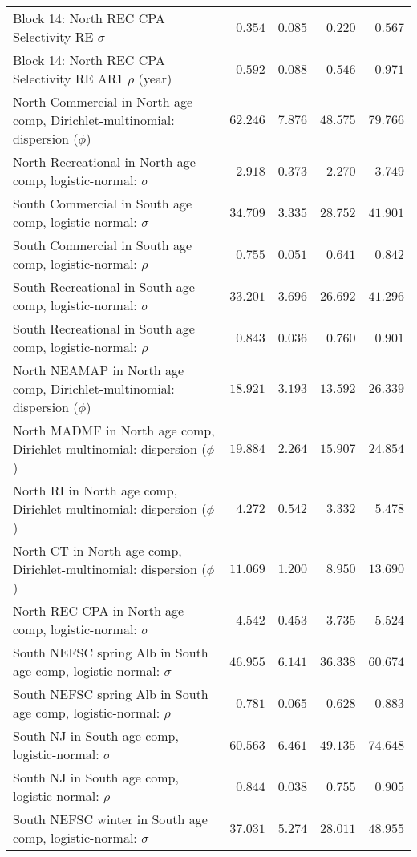\documentclass[
]{article}
\begin{document}
\begin{landscape}
\begin{longtable}[t]{lrrrr}
Block 14: North REC CPA Selectivity RE $\sigma$ & $0.354$ & $0.085$ & $0.220$ & $0.567$\\
\addlinespace
Block 14: North REC CPA Selectivity RE AR1 $\rho$ (year) & $0.592$ & $0.088$ & $0.546$ & $0.971$\\
North Commercial in North age comp, Dirichlet-multinomial: dispersion ($\phi$) & $62.246$ & $7.876$ & $48.575$ & $79.766$\\
North Recreational in North age comp, logistic-normal: $\sigma$ & $2.918$ & $0.373$ & $2.270$ & $3.749$\\
South Commercial in South age comp, logistic-normal: $\sigma$ & $34.709$ & $3.335$ & $28.752$ & $41.901$\\
South Commercial in South age comp, logistic-normal: $\rho$ & $0.755$ & $0.051$ & $0.641$ & $0.842$\\
\addlinespace
South Recreational in South age comp, logistic-normal: $\sigma$ & $33.201$ & $3.696$ & $26.692$ & $41.296$\\
South Recreational in South age comp, logistic-normal: $\rho$ & $0.843$ & $0.036$ & $0.760$ & $0.901$\\
North NEAMAP in North age comp, Dirichlet-multinomial: dispersion ($\phi$) & $18.921$ & $3.193$ & $13.592$ & $26.339$\\
North MADMF in North age comp, Dirichlet-multinomial: dispersion ($\phi$) & $19.884$ & $2.264$ & $15.907$ & $24.854$\\
North RI in North age comp, Dirichlet-multinomial: dispersion ($\phi$) & $4.272$ & $0.542$ & $3.332$ & $5.478$\\
\addlinespace
North CT in North age comp, Dirichlet-multinomial: dispersion ($\phi$) & $11.069$ & $1.200$ & $8.950$ & $13.690$\\
North REC CPA in North age comp, logistic-normal: $\sigma$ & $4.542$ & $0.453$ & $3.735$ & $5.524$\\
South NEFSC spring Alb in South age comp, logistic-normal: $\sigma$ & $46.955$ & $6.141$ & $36.338$ & $60.674$\\
South NEFSC spring Alb in South age comp, logistic-normal: $\rho$ & $0.781$ & $0.065$ & $0.628$ & $0.883$\\
South NJ in South age comp, logistic-normal: $\sigma$ & $60.563$ & $6.461$ & $49.135$ & $74.648$\\
\addlinespace
South NJ in South age comp, logistic-normal: $\rho$ & $0.844$ & $0.038$ & $0.755$ & $0.905$\\
South NEFSC winter in South age comp, logistic-normal: $\sigma$ & $37.031$ & $5.274$ & $28.011$ & $48.955$\\

\end{longtable}
\end{landscape}
\end{document}
